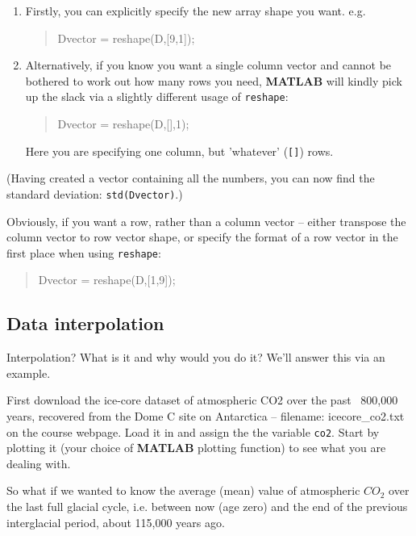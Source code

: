 \documentclass{tufte-book} %
\newenvironment{docspec}{\begin{quotation}\ttfamily\parskip0pt\parindent0pt\ignorespaces}{\end{quotation}}
\begin{document}
\begin{enumerate}[noitemsep]
\setlength{\itemindent}{.2in}
\item Firstly, you can explicitly specify the new array shape you want. e.g.
\begin{docspec}
Dvector = reshape(D,[9,1]);
\end{docspec}
\item Alternatively, if you know you want a single column vector and cannot be bothered to work out how many rows you need, \textbf{MATLAB} will kindly pick up the slack via a slightly different usage of \texttt{reshape}:
\begin{docspec}
Dvector = reshape(D,[],1);
\end{docspec}
Here you are specifying one column, but 'whatever' (\texttt{[]}) rows.
\end{enumerate}

\noindent(Having created a vector containing all the numbers, you can now find the standard deviation: \texttt{std(Dvector)}.)

Obviously, if you want a row, rather than a column vector -- either transpose the column vector to row vector shape, or specify the format of a row vector in the first place when using \texttt{reshape}:
\begin{docspec}
Dvector = reshape(D,[1,9]);
\end{docspec}


\newpage 

\subsection{Data interpolation}

Interpolation? What is it and why would you do it? We'll answer this via an example. 

First download the ice-core dataset of atmospheric CO2 over the past ~800,000 years, recovered from the Dome C site on Antarctica -- filename: \textsf{icecore\_co2.txt} on the course webpage. Load it in and assign the the variable \texttt{co2}. Start by plotting it (your choice of \textbf{MATLAB} plotting function) to see what you are dealing with.

So what if we wanted to know the average (mean) value of atmospheric \(CO_{2}\) over the last full glacial cycle, i.e. between now (age zero) and the end of the previous interglacial period, about 115,000 years ago.
\end{document}
